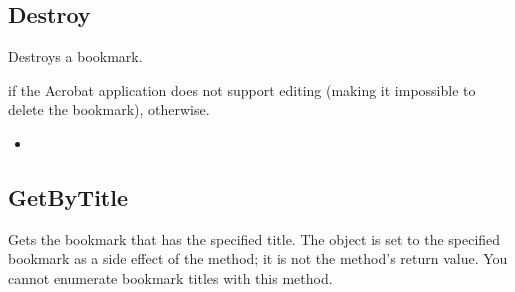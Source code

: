 \documentclass[letterpaper,12pt,english,openany,oneside]{sphinxmanual}
\begin{document}
\subsection{Destroy}
\label{\detokenize{IAC_API_OLE_Objects:destroy}}
Destroys a bookmark.


\begin{sphinxVerbatim}[commandchars=\\\{\}]
 
\end{sphinxVerbatim}


 if the Acrobat application does not support editing (making it impossible to delete the bookmark),  otherwise.

\label{\detokenize{IAC_API_OLE_Objects:related-methods-82}}
\begin{itemize}
\item {} 
 

\end{itemize}




\subsection{GetByTitle}
\label{\detokenize{IAC_API_OLE_Objects:getbytitle}}
Gets the bookmark that has the specified title. The  object is set to the specified bookmark as a side effect of the method; it is not the method’s return value. You cannot enumerate bookmark titles with this method.


\begin{sphinxVerbatim}[commandchars=\\\{\}]
  
                  
\end{sphinxVerbatim}
\label{\detokenize{IAC_API_OLE_Objects:parameters-47}}
\end{document}
